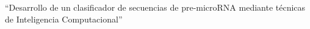 \LARGE
  ``Desarrollo de un clasificador de secuencias de pre-microRNA
  mediante técnicas de Inteligencia Computacional''
